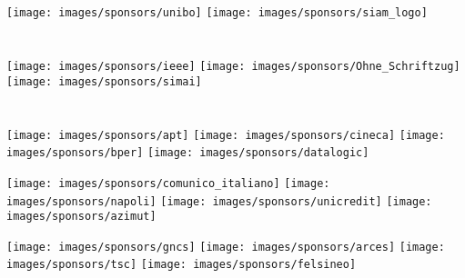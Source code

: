 \newpage
{}

\setlength{\columnseprule}{0pt}
\begin{center}

\section*{\color{siamblue}{ORGANIZED BY}}
\vspace{0.1cm}

\begin{multicols}{4}
\texttt{[image: images/sponsors/unibo]}    
\texttt{[image: images/sponsors/siam\_logo]} 
\end{multicols}

\section*{\color{siamblue}{IN COOPERATION WITH}}
\vspace{0.1cm}

\begin{multicols}{4}
\texttt{[image: images/sponsors/ieee]} 
\texttt{[image: images/sponsors/Ohne\_Schriftzug]} 
\texttt{[image: images/sponsors/simai]}
\end{multicols}

\section*{\color{siamblue}{SPONSOR}}
\vspace{0.1cm}

\begin{multicols}{4}
\texttt{[image: images/sponsors/apt]}    
\texttt{[image: images/sponsors/cineca]} 
\texttt{[image: images/sponsors/bper]}
\texttt{[image: images/sponsors/datalogic]}
\end{multicols}

\begin{multicols}{4}
\texttt{[image: images/sponsors/comunico\_italiano]} 
\texttt{[image: images/sponsors/napoli]} 
\texttt{[image: images/sponsors/unicredit]} 
\texttt{[image: images/sponsors/azimut]}
\end{multicols}

\begin{multicols}{4}
\texttt{[image: images/sponsors/gncs]}
\texttt{[image: images/sponsors/arces]} 
\texttt{[image: images/sponsors/tsc]} 
\texttt{[image: images/sponsors/felsineo]}
\end{multicols}


\end{center}
